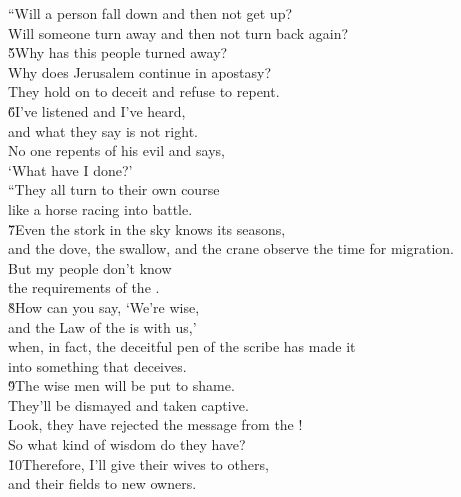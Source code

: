 \begin{poetry}
\poeml ``Will a person fall down and then not get up? \\
\poemll    Will someone turn away and then not turn back again? \\
\poeml \v{5}Why has this people turned away? \\
\poemll    Why does Jerusalem continue in apostasy? \\
\poemlll       They hold on to deceit and refuse to repent. \\
\poeml \v{6}I've listened and I've heard, \\
\poemll    and what they say is not right. \\
\poeml No one repents of his evil and says, \\
\poemll    `What have I done?' \\
\poeml ``They all turn to their own course \\
\poemll    like a horse racing into battle. \\
\poeml \v{7}Even the stork in the sky knows its seasons, \\
\poemll    and the dove, the swallow, and the crane observe the time for migration. \\
\poeml But my people don't know \\
\poemll    the requirements of the . \\
\poeml \v{8}How can you say, `We're wise, \\
\poemll    and the Law of the  is with us,' \\
\poeml when, in fact, the deceitful pen of the scribe has made it \\
\poemll    into something that deceives. \\
\poeml \v{9}The wise men will be put to shame. \\
\poemll    They'll be dismayed and taken captive. \\
\poeml Look, they have rejected the message from the ! \\
\poemll    So what kind of wisdom do they have? \\
\poeml \v{10}Therefore, I'll give their wives to others, \\
\poemll    and their fields to new owners. \\

\end{poetry}
